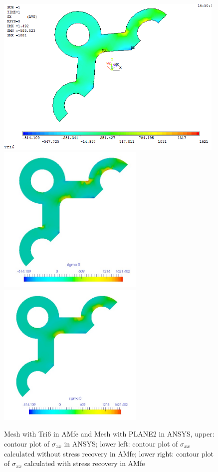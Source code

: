 \begin{figure}[htbp]
	\begin{center}
		\includegraphics[width=11cm,clip]{Tri6_Sxx.png} 	
		\includegraphics[width=7cm,clip]{Tri6_Sxx_PD.png} 	
		\includegraphics[width=7cm,clip]{Tri6_Sxx_P.png} 		
		\caption{Mesh with Tri6 in AMfe and Mesh with PLANE2 in ANSYS, upper: contour plot of $\sigma_{xx}$ in ANSYS; lower left: contour plot of $\sigma_{xx}$ calculated without stress recovery in AMfe; lower right: contour plot of $\sigma_{xx}$ calculated with stress recovery in AMfe} \label{fig: Tri6_Sxx}
	\end{center}
\end{figure}
\clearpage 

